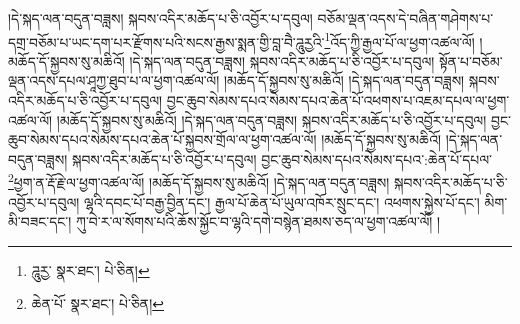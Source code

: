 །དེ་སྐད་ལན་བདུན་བཟླས། སྐབས་འདིར་མཆོད་པ་ཅི་འབྱོར་པ་དབུལ། བཅོམ་ལྡན་འདས་དེ་བཞིན་གཤེགས་པ་དགྲ་བཅོམ་པ་ཡང་དག་པར་རྫོགས་པའི་སངས་རྒྱས་སྨན་གྱི་བླ་བཻ་ཌཱུརྱའི་\footnote{ཌཱུརྱ་  སྣར་ཐང་།  པེ་ཅིན། }འོད་ཀྱི་རྒྱལ་པོ་ལ་ཕྱག་འཚལ་ལོ། །མཆོད་དོ་སྐྱབས་སུ་མཆིའོ། །དེ་སྐད་ལན་བདུན་བཟླས། སྐབས་འདིར་མཆོད་པ་ཅི་འབྱོར་པ་དབུལ། སྟོན་པ་བཅོམ་ལྡན་འདས་དཔལ་ཤཱཀྱ་ཐུབ་པ་ལ་ཕྱག་འཚལ་ལོ། །མཆོད་དོ་སྐྱབས་སུ་མཆིའོ། །དེ་སྐད་ལན་བདུན་བཟླས། སྐབས་འདིར་མཆོད་པ་ཅི་འབྱོར་པ་དབུལ། བྱང་ཆུབ་སེམས་དཔའ་སེམས་དཔའ་ཆེན་པོ་འཕགས་པ་འཇམ་དཔལ་ལ་ཕྱག་འཚལ་ལོ། །མཆོད་དོ་སྐྱབས་སུ་མཆིའོ། །དེ་སྐད་ལན་བདུན་བཟླས། སྐབས་འདིར་མཆོད་པ་ཅི་འབྱོར་པ་དབུལ། བྱང་ཆུབ་སེམས་དཔའ་སེམས་དཔའ་ཆེན་པོ་སྐྱབས་གྲོལ་ལ་ཕྱག་འཚལ་ལོ། །མཆོད་དོ་སྐྱབས་སུ་མཆིའོ། །དེ་སྐད་ལན་བདུན་བཟླས། སྐབས་འདིར་མཆོད་པ་ཅི་འབྱོར་པ་དབུལ། བྱང་ཆུབ་སེམས་དཔའ་སེམས་དཔའ་:ཆེན་པོ་དཔལ་\footnote{ཆེན་པོ་  སྣར་ཐང་།  པེ་ཅིན། }ཕྱག་ན་རྡོ་རྗེ་ལ་ཕྱག་འཚལ་ལོ། །མཆོད་དོ་སྐྱབས་སུ་མཆིའོ། །དེ་སྐད་ལན་བདུན་བཟླས། སྐབས་འདིར་མཆོད་པ་ཅི་འབྱོར་པ་དབུལ། ལྷའི་དབང་པོ་བརྒྱ་བྱིན་དང་། རྒྱལ་པོ་ཆེན་པོ་ཡུལ་འཁོར་སྲུང་དང་། འཕགས་སྐྱེས་པོ་དང་། མིག་མི་བཟང་དང་། ཀུ་བེ་ར་ལ་སོགས་པའི་ཆོས་སྐྱོང་བ་ལྷའི་དགེ་བསྙེན་ཐམས་ཅད་ལ་ཕྱག་འཚལ་ལོ། །
